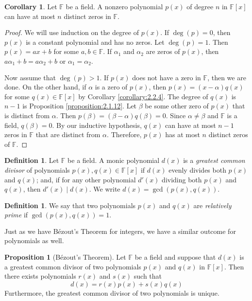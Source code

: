 \documentclass[11pt]{book}
\theoremstyle{definition}\newtheorem{definition}[subsection]{Definition}
\theoremstyle{definition}\newtheorem{example}[subsection]{Example}
\theoremstyle{definition}\newtheorem{notation}[subsection]{Notation}
\theoremstyle{definition}\newtheorem{remark}[subsection]{Remark}
\theoremstyle{theorem}\newtheorem{theorem}[subsection]{Theorem}
\theoremstyle{theorem}\newtheorem{lemma}[subsection]{Lemma}
\theoremstyle{theorem}\newtheorem{proposition}[subsection]{Proposition}
\theoremstyle{theorem}\newtheorem{corollary}[subsection]{Corollary}
\newcommand{\F}{\mathbb{F}}
\begin{document}
\begin{corollary}\label{corollary:2.2.5}
    Let $\F$ be a field. A nonzero polynomial $p(x)$ of degree $n$ in $\F[x]$ can have at most $n$ distinct zeros in $\F$.
\end{corollary}

\begin{proof}
    We will use induction on the degree of $p(x)$. If $\deg(p) = 0$, then $p(x)$ is a constant polynomial and has no zeros. Let $\deg(p) = 1$. Then $p(x) = ax + b$ for some $a, b \in \F$. If $\alpha_1$ and $\alpha_2$ are zeros of $p(x)$, then $a\alpha_1 + b = a\alpha_2 + b$ or $\alpha_1 = \alpha_2$.

    Now assume that $\deg(p) > 1$. If $p(x)$ does not have a zero in $\F$, then we are done. On the other hand, if $\alpha$ is a zero of $p(x)$, then $p(x) = (x - \alpha)q(x)$ for some $q(x) \in \F[x]$ by Corollary \ref{corollary:2.2.4}. The degree of $q(x)$ is $n - 1$ is Proposition \ref{proposition:2.1.12}. Let $\beta$ be some other zero of $p(x)$ that is distinct from $\alpha$. Then $p(\beta) = (\beta - \alpha)q(\beta) = 0$. Since $\alpha \neq \beta$ and $\F$ is a field, $q(\beta) = 0$. By our inductive hypothesis, $q(x)$ can have at most $n - 1$ zeros in $\F$ that are distinct from $\alpha$. Therefore, $p(x)$ has at most $n$ distinct zeros of $\F$.
\end{proof}

\begin{definition}\label{definition:2.2.6}
    Let $\F$ be a field. A monic polynomial $d(x)$ is a \emph{greatest common divisor} of polynomials $p(x), q(x) \in \F[x]$ if $d(x)$ evenly divides both $p(x)$ and $q(x)$; and, if for any other polynomial $d'(x)$ dividing both $p(x)$ and $q(x)$, then $d'(x) \mid d(x)$. We write $d(x) = \gcd(p(x), q(x))$.
\end{definition}

\begin{definition}\label{definition:2.2.7}
    We say that two polynomials $p(x)$ and $q(x)$ are \emph{relatively prime} if $\gcd(p(x), q(x)) = 1$.
\end{definition}

Just as we have Bézout's Theorem for integers, we have a similar outcome for polynomials as well.

\begin{proposition}[Bézout's Theorem]\label{proposition:2.2.8}
    Let $\F$ be a field and suppose that $d(x)$ is a greatest common divisor of two polynomials $p(x)$ and $q(x)$ in $\F[x]$. Then there exists polynomials $r(x)$ and $s(x)$ such that
    \begin{equation*}
        d(x) = r(x)p(x) + s(x)q(x)
    \end{equation*}
    Furthermore, the greatest common divisor of two polynomials is unique.
\end{proposition}
\end{document}
